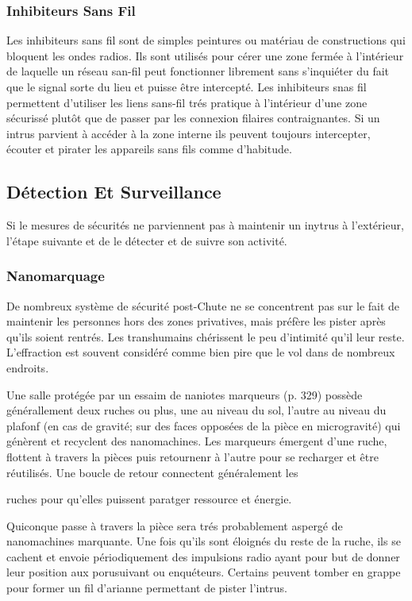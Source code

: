 \subsubsection{Inhibiteurs Sans Fil} 

Les inhibiteurs sans fil sont de simples peintures ou matériau de constructions qui bloquent les ondes radios. Ils sont utilisés pour cérer une zone fermée à l'intérieur de laquelle un réseau san-fil peut fonctionner librement sans s'inquiéter du fait que le signal sorte du lieu et puisse être intercepté. Les inhibiteurs snas fil permettent d'utiliser les liens sans-fil trés pratique à l'intérieur d'une zone sécurissé plutôt que de passer par les connexion filaires contraignantes. Si un intrus parvient à accéder à la zone interne ils peuvent toujours intercepter, écouter et pirater les appareils sans fils comme d'habitude. 

\subsection{Détection Et Surveillance} 

Si le mesures de sécurités ne parviennent pas à maintenir un inytrus à l'extérieur, l'étape suivante et de le détecter et de suivre son activité. 

\subsubsection{Nanomarquage} 

De nombreux système de sécurité post-Chute ne se concentrent pas sur le fait de maintenir les personnes hors des zones privatives, mais préfère les pister après qu'ils soient rentrés. Les transhumains chérissent le peu d'intimité qu'il leur reste. L'effraction est souvent considéré comme bien pire que le vol dans de nombreux endroits. 

Une salle protégée par un essaim de naniotes marqueurs (p. 329) possède générallement deux ruches ou plus, une au niveau du sol, l'autre au niveau du plafonf (en cas de gravité; sur des faces opposées de la pièce en microgravité) qui génèrent et recyclent des nanomachines. Les marqueurs émergent d'une ruche, flottent à travers la pièces puis retournenr à l'autre pour  se recharger et être réutilisés. Une boucle de retour connectent généralement les 

ruches pour qu'elles puissent paratger ressource et énergie. 

Quiconque passe à travers la pièce sera trés probablement aspergé de nanomachines marquante. Une fois qu'ils sont éloignés du reste de la ruche, ils se cachent et envoie périodiquement des impulsions radio ayant pour but de donner leur position aux porusuivant ou enquéteurs. Certains peuvent tomber en grappe pour former un fil d'arianne permettant de pister l'intrus. 

